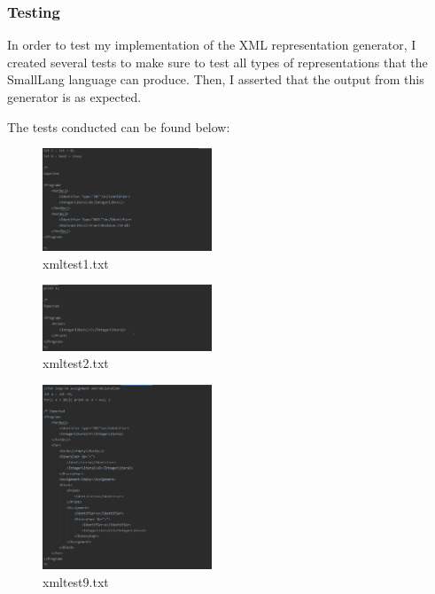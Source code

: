 \documentclass{article}
\begin{document}
				
				\subsubsection{Testing}
				
				In order to test my implementation of the XML representation generator, I created several tests to make sure to test all types of representations that the SmallLang language can produce. Then, I asserted that the output from this generator is as expected.
				
				The tests conducted can be found below:
				\begin{multicols}{2}
			
			
				\begin{figure}[H]
					\centering
			 			\includegraphics[width=0.45\textwidth]{xmltest1.png}
			 			\centering
			  			\caption{xmltest1.txt}
			  			\label{fig:xmltest1}
					\end{figure}
					
			\begin{figure}[H]
					\centering
			 			\includegraphics[width=0.45\textwidth]{xmltest2.png}
			 			\centering
			  			\caption{xmltest2.txt}
			  			\label{fig:xmltest2}
					\end{figure}
					
										
					\begin{figure}[H]
					\centering
			 			\includegraphics[width=0.45\textwidth]{xmltest9.png}
			 			\centering
			  			\caption{xmltest9.txt}
			  			\label{fig:xmltest9}
					\end{figure}
					


\end{multicols}
\end{document}
